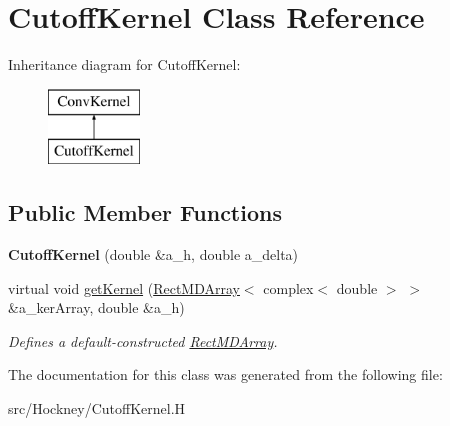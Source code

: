 \hypertarget{class_cutoff_kernel}{}\section{Cutoff\+Kernel Class Reference}
\label{class_cutoff_kernel}
Inheritance diagram for Cutoff\+Kernel\+:\begin{figure}[H]
\begin{center}
\leavevmode
\includegraphics[height=2.000000cm]{class_cutoff_kernel}
\end{center}
\end{figure}
\subsection*{Public Member Functions}
\begin{DoxyCompactItemize}
\item 
\mbox{\label{class_cutoff_kernel_a48c10b9caddf5456baef4da2e315d6e6}} 
{\bfseries Cutoff\+Kernel} (double \&a\+\_\+h, double a\+\_\+delta)
\item 
\mbox{\label{class_cutoff_kernel_a9d3c6da0861bc97f3c9d885ecab28489}} 
virtual void \hyperlink{class_cutoff_kernel_a9d3c6da0861bc97f3c9d885ecab28489}{get\+Kernel} (\hyperlink{class_rect_m_d_array}{Rect\+M\+D\+Array}$<$ complex$<$ double $>$ $>$ \&a\+\_\+ker\+Array, double \&a\+\_\+h)
\begin{DoxyCompactList}\small\item\em Defines a default-\/constructed \hyperlink{class_rect_m_d_array}{Rect\+M\+D\+Array}. \end{DoxyCompactList}\end{DoxyCompactItemize}


The documentation for this class was generated from the following file\+:\begin{DoxyCompactItemize}
\item 
src/\+Hockney/Cutoff\+Kernel.\+H\end{DoxyCompactItemize}
